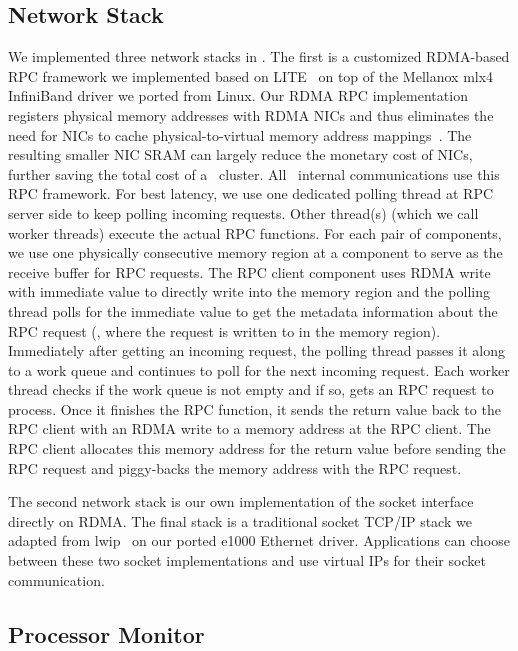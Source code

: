 \subsection{Network Stack}
We implemented three network stacks in \lego.
The first is a customized RDMA-based RPC framework we implemented based on LITE~\cite{Tsai17-SOSP}
on top of the Mellanox mlx4 InfiniBand driver we ported from Linux.
Our RDMA RPC implementation registers physical memory addresses with RDMA NICs 
and thus eliminates the need for NICs to cache physical-to-virtual memory address mappings~\cite{Tsai17-SOSP}.
The resulting smaller NIC SRAM can largely reduce the monetary cost of NICs,
further saving the total cost of a \lego\ cluster.
All \lego\ internal communications use this RPC framework.
For best latency, we use one dedicated polling thread at RPC server side to keep polling incoming requests.
Other thread(s) (which we call worker threads) execute the actual RPC functions. 
For each pair of components, we use one physically consecutive memory region at a component
to serve as the receive buffer for RPC requests. 
The RPC client component uses RDMA write with immediate value to directly write 
into the memory region and the polling thread polls for the immediate value to get the metadata 
information about the RPC request (\eg, where the request is written to in the memory region).
Immediately after getting an incoming request, the polling thread passes it along to a 
work queue and continues to poll for the next incoming request.
Each worker thread checks if the work queue is not empty and if so, gets an RPC request 
to process. Once it finishes the RPC function, it sends the return value back to the RPC client 
with an RDMA write to a memory address at the RPC client.
The RPC client allocates this memory address for the return value before sending the RPC request
and piggy-backs the memory address with the RPC request.

The second network stack is our own implementation of the socket interface directly on RDMA.
The final stack is a traditional socket TCP/IP stack we adapted from lwip~\cite{lwip} 
on our ported e1000 Ethernet driver.
Applications can choose between these two socket implementations 
and use virtual IPs for their socket communication.

\subsection{Processor Monitor}
\label{sec:lego:procimpl}

